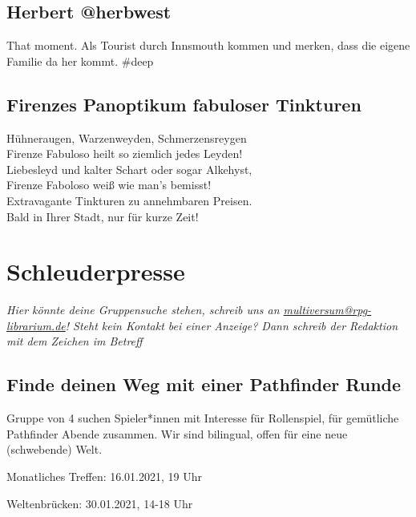 \documentclass[final]{multiversum}
\begin{document}
\subsection{Herbert @herbwest}
That moment. Als Tourist durch Innsmouth kommen und merken, dass die eigene Familie da her kommt. \#deep

\subsection{Firenzes Panoptikum fabuloser Tinkturen}
Hühneraugen, Warzenweyden, Schmerzensreygen\\
Firenze Fabuloso heilt so ziemlich jedes Leyden!\\
Liebesleyd und kalter Schart oder sogar Alkehyst,\\
Firenze Faboloso weiß wie man's bemisst!\\[1em]
Extravagante Tinkturen zu annehmbaren Preisen.\\
Bald in Ihrer Stadt, nur für kurze Zeit! 

\section{Schleuderpresse}
\textit{Hier könnte deine Gruppensuche stehen, schreib uns an \href{mailto:multiversum@rpg-librarium.de}{multiversum@rpg-librarium.de}! 
Steht kein Kontakt bei einer Anzeige? Dann schreib der Redaktion mit dem Zeichen im Betreff}

\subsection{Finde deinen Weg mit einer Pathfinder Runde}
Gruppe von 4 suchen Spieler*innen mit Interesse für Rollenspiel, für gemütliche Pathfinder Abende zusammen.
Wir sind bilingual, offen für eine neue (schwebende) Welt.

\begin{termine}
\item Monatliches Treffen: 16.01.2021, 19 Uhr
\item Weltenbrücken: 30.01.2021, 14-18 Uhr
\end{termine}
\impressum
\end{document}
